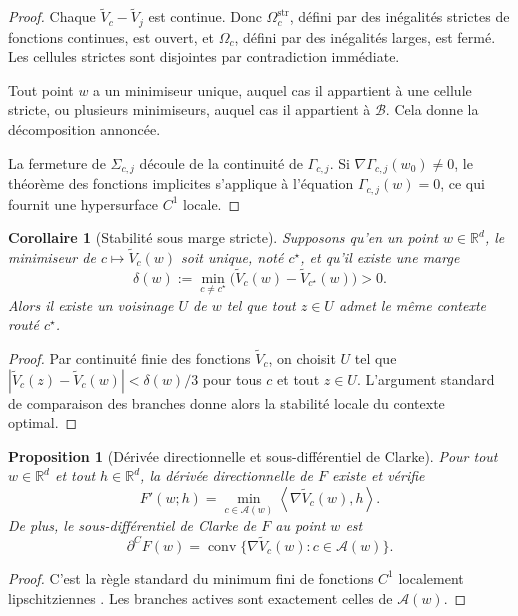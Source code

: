 \documentclass[11pt,a4paper]{article}
\newtheorem{proposition}{Proposition}[section]
\newtheorem{corollary}{Corollaire}[section]
\DeclareMathOperator{\conv}{conv}
\newcommand{\R}{\mathbb R}
\newcommand{\Acal}{\mathcal A}
\newcommand{\Bcal}{\mathcal B}
\begin{document}
\begin{proof}
Chaque \(\widetilde V_c-\widetilde V_j\) est continue. Donc \(\Omega_c^{\mathrm{str}}\), défini par des inégalités strictes de fonctions continues, est ouvert, et \(\Omega_c\), défini par des inégalités larges, est fermé. Les cellules strictes sont disjointes par contradiction immédiate.

Tout point \(w\) a un minimiseur unique, auquel cas il appartient à une cellule stricte, ou plusieurs minimiseurs, auquel cas il appartient à \(\Bcal\). Cela donne la décomposition annoncée.

La fermeture de \(\Sigma_{c,j}\) découle de la continuité de \(\Gamma_{c,j}\). Si \(\nabla\Gamma_{c,j}(w_0)\neq 0\), le théorème des fonctions implicites s'applique à l'équation \(\Gamma_{c,j}(w)=0\), ce qui fournit une hypersurface \(C^1\) locale.
\end{proof}

\begin{corollary}[Stabilité sous marge stricte]
Supposons qu'en un point \(w\in\R^d\), le minimiseur de \(c\mapsto \widetilde V_c(w)\) soit unique, noté \(c^\star\), et qu'il existe une marge
\[
\delta(w):=\min_{c\neq c^\star}\bigl(\widetilde V_c(w)-\widetilde V_{c^\star}(w)\bigr)>0.
\]
Alors il existe un voisinage \(U\) de \(w\) tel que tout \(z\in U\) admet le même contexte routé \(c^\star\).
\end{corollary}

\begin{proof}
Par continuité finie des fonctions \(\widetilde V_c\), on choisit \(U\) tel que \(|\widetilde V_c(z)-\widetilde V_c(w)|<\delta(w)/3\) pour tous \(c\) et tout \(z\in U\). L'argument standard de comparaison des branches donne alors la stabilité locale du contexte optimal.
\end{proof}

\begin{proposition}[Dérivée directionnelle et sous-différentiel de Clarke]
Pour tout \(w\in\R^d\) et tout \(h\in\R^d\), la dérivée directionnelle de \(F\) existe et vérifie
\[
F'(w;h)=\min_{c\in\Acal(w)}\left\langle \nabla \widetilde V_c(w),h\right\rangle.
\]
De plus, le sous-différentiel de Clarke de \(F\) au point \(w\) est
\[
\partial^C F(w)=\conv\{\nabla \widetilde V_c(w): c\in\Acal(w)\}.
\]
\end{proposition}

\begin{proof}
C'est la règle standard du minimum fini de fonctions \(C^1\) localement lipschitziennes \cite{Clarke1983}. Les branches actives sont exactement celles de \(\Acal(w)\).
\end{proof}
\end{document}
